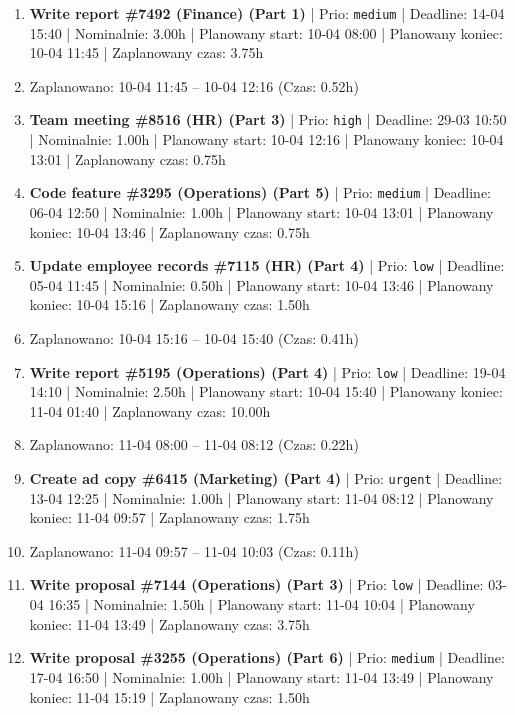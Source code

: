 {\begin{enumerate}
  \item [\textbf{14642}] \textbf{Write report \#7492 (Finance) (Part 1)} | Prio: \texttt{medium} | Deadline: 14-04 15:40 | Nominalnie: 3.00h | Planowany start: 10-04 08:00 | Planowany koniec: 10-04 11:45 | Zaplanowany czas: 3.75h
  \item [\textbf{PRZERWA}] Zaplanowano: 10-04 11:45 -- 10-04 12:16 (Czas: 0.52h)
  \item [\textbf{14624}] \textbf{Team meeting \#8516 (HR) (Part 3)} | Prio: \texttt{high} | Deadline: 29-03 10:50 | Nominalnie: 1.00h | Planowany start: 10-04 12:16 | Planowany koniec: 10-04 13:01 | Zaplanowany czas: 0.75h
  \item [\textbf{14645}] \textbf{Code feature \#3295 (Operations) (Part 5)} | Prio: \texttt{medium} | Deadline: 06-04 12:50 | Nominalnie: 1.00h | Planowany start: 10-04 13:01 | Planowany koniec: 10-04 13:46 | Zaplanowany czas: 0.75h
  \item [\textbf{14701}] \textbf{Update employee records \#7115 (HR) (Part 4)} | Prio: \texttt{low} | Deadline: 05-04 11:45 | Nominalnie: 0.50h | Planowany start: 10-04 13:46 | Planowany koniec: 10-04 15:16 | Zaplanowany czas: 1.50h
  \item [\textbf{PRZERWA}] Zaplanowano: 10-04 15:16 -- 10-04 15:40 (Czas: 0.41h)
  \item [\textbf{14687}] \textbf{Write report \#5195 (Operations) (Part 4)} | Prio: \texttt{low} | Deadline: 19-04 14:10 | Nominalnie: 2.50h | Planowany start: 10-04 15:40 | Planowany koniec: 11-04 01:40 | Zaplanowany czas: 10.00h
  \item [\textbf{PRZERWA}] Zaplanowano: 11-04 08:00 -- 11-04 08:12 (Czas: 0.22h)
  \item [\textbf{14602}] \textbf{Create ad copy \#6415 (Marketing) (Part 4)} | Prio: \texttt{urgent} | Deadline: 13-04 12:25 | Nominalnie: 1.00h | Planowany start: 11-04 08:12 | Planowany koniec: 11-04 09:57 | Zaplanowany czas: 1.75h
  \item [\textbf{PRZERWA}] Zaplanowano: 11-04 09:57 -- 11-04 10:03 (Czas: 0.11h)
  \item [\textbf{14702}] \textbf{Write proposal \#7144 (Operations) (Part 3)} | Prio: \texttt{low} | Deadline: 03-04 16:35 | Nominalnie: 1.50h | Planowany start: 11-04 10:04 | Planowany koniec: 11-04 13:49 | Zaplanowany czas: 3.75h
  \item [\textbf{14654}] \textbf{Write proposal \#3255 (Operations) (Part 6)} | Prio: \texttt{medium} | Deadline: 17-04 16:50 | Nominalnie: 1.00h | Planowany start: 11-04 13:49 | Planowany koniec: 11-04 15:19 | Zaplanowany czas: 1.50h

\end{enumerate}}
